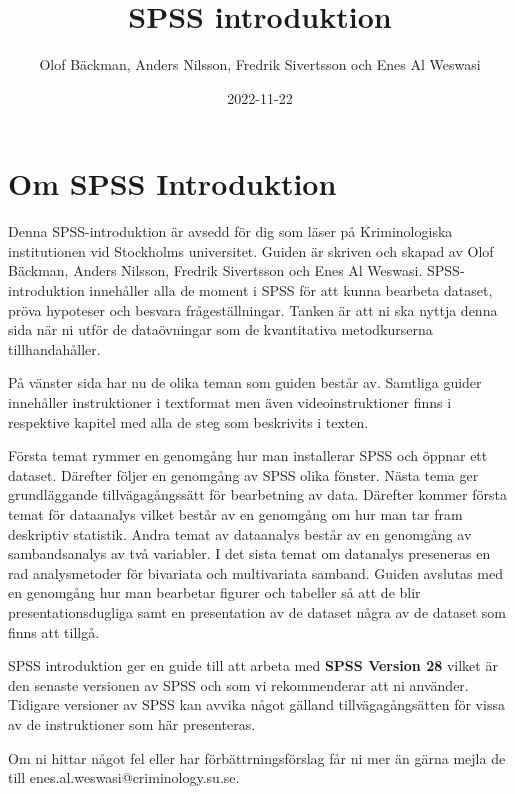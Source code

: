 \documentclass[
]{book}
\title{SPSS introduktion}
\author{Olof Bäckman, Anders Nilsson, Fredrik Sivertsson och Enes Al Weswasi}
\date{2022-11-22}
\begin{document}
\maketitle

{
\hypersetup{linkcolor=}
\setcounter{tocdepth}{1}
\tableofcontents
}
\hypertarget{om-spss-introduktion}{%
\chapter*{Om SPSS Introduktion}\label{om-spss-introduktion}}

Denna SPSS-introduktion är avsedd för dig som läser på Kriminologiska institutionen vid Stockholms universitet. Guiden är skriven och skapad av Olof Bäckman, Anders Nilsson, Fredrik Sivertsson och Enes Al Weswasi. SPSS-introduktion innehåller alla de moment i SPSS för att kunna bearbeta dataset, pröva hypoteser och besvara frågeställningar. Tanken är att ni ska nyttja denna sida när ni utför de dataövningar som de kvantitativa metodkurserna tillhandahåller.

På vänster sida har nu de olika teman som guiden består av. Samtliga guider innehåller instruktioner i textformat men även videoinstruktioner finns i respektive kapitel med alla de steg som beskrivits i texten.

Första temat rymmer en genomgång hur man installerar SPSS och öppnar ett dataset. Därefter följer en genomgång av SPSS olika fönster. Nästa tema ger grundläggande tillvägagångssätt för bearbetning av data. Därefter kommer första temat för dataanalys vilket består av en genomgång om hur man tar fram deskriptiv statistik. Andra temat av dataanalys består av en genomgång av sambandsanalys av två variabler. I det sista temat om datanalys preseneras en rad analysmetoder för bivariata och multivariata samband. Guiden avslutas med en genomgång hur man bearbetar figurer och tabeller så att de blir presentationsdugliga samt en presentation av de dataset några av de dataset som finns att tillgå.

SPSS introduktion ger en guide till att arbeta med \textbf{SPSS Version 28} vilket är den senaste versionen av SPSS och som vi rekommenderar att ni använder. Tidigare versioner av SPSS kan avvika något gälland tillvägagångsätten för vissa av de instruktioner som här presenteras.

Om ni hittar något fel eller har förbättrningsförslag får ni mer än gärna mejla de till enes.al.weswasi@criminology.su.se.
\end{document}
